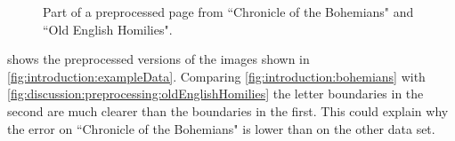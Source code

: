 	\begin{figure}[t]
		\centering
		\hfil
		\caption{Part of a preprocessed page from \protect{} ``Chronicle of the Bohemians" and \protect{} ``Old English Homilies".}
		\label{fig:discussion:preprocessing:preprocessedExampleData}
	\end{figure}
 shows the preprocessed versions of the images shown in \cref{fig:introduction:exampleData}. Comparing \cref{fig:introduction:bohemians} with \ref{fig:discussion:preprocessing:oldEnglishHomilies} the letter boundaries in the second are much clearer than the boundaries in the first. This could explain why the error on ``Chronicle of the Bohemians" is lower than on the other data set. 
